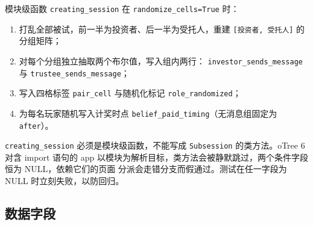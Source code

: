 \documentclass[10pt,a4paper]{ctexart}
\newcommand{\code}[1]{\texttt{#1}}
\begin{document}
模块级函数 \code{creating\_session} 在 \code{randomize\_cells=True} 时：

\begin{enumerate}
  \item 打乱全部被试，前一半为投资者、后一半为受托人，重建 \code{[投资者, 受托人]} 的分组矩阵；
  \item 对每个分组独立抽取两个布尔值，写入组内两行：
        \code{investor\_sends\_message} 与 \code{trustee\_sends\_message}；
  \item 写入四格标签 \code{pair\_cell} 与随机化标记 \code{role\_randomized}；
  \item 为每名玩家随机写入计奖时点 \code{belief\_paid\_timing}（无消息组固定为 \code{after}）。
\end{enumerate}

\code{creating\_session} 必须是模块级函数，不能写成 \code{Subsession} 的类方法。oTree 6 对含
import 语句的 app 以模块为解析目标，类方法会被静默跳过，两个条件字段恒为 NULL，依赖它们的页面
分派会走错分支而假通过。测试在任一字段为 NULL 时立刻失败，以防回归。

\subsection{数据字段}
\end{document}
